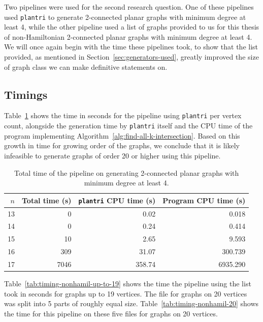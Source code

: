Two pipelines were used for the second research question. One of these pipelines used \texttt{plantri} to generate 2-connected planar graphs with minimum degree at least 4, while the other pipeline used a list of graphs provided to us for this thesis of non-Hamiltonian 2-connected planar graphs with minimum degree at least 4. We will once again begin with the time these pipelines took, to show that the list provided, as mentioned in Section~\ref{sec:generators-used}, greatly improved the size of graph class we can make definitive statements on.

\subsection{Timings}
\label{sec:2-timing}

Table~\ref{tab:timing-planar-m4} shows the time in seconds for the pipeline using \texttt{plantri} per vertex count, alongside the generation time by \texttt{plantri} itself and the CPU time of the program implementing Algorithm~\ref{alg:find-all-k-intersection}. Based on this growth in time for growing order of the graphs, we conclude that it is likely infeasible to generate graphs of order 20 or higher using this pipeline.

\begin{table}[ht]
\centering
\caption{Total time of the pipeline on generating 2-connected planar graphs with minimum degree at least 4.}
\label{tab:timing-planar-m4}
\begin{tabular}{rrrr}
\toprule
$n$ & Total time (s) & \texttt{plantri} CPU time (s) & Program CPU time (s) \\
\midrule
13 & 0 & 0.02 & 0.018 \\
14 & 0 & 0.24 & 0.414 \\
15 & 10 & 2.65 & 9.593 \\
16 & 309 & 31.07 & 300.739 \\
17 & 7046 & 358.74 & 6935.290 \\
\bottomrule
\end{tabular}
\end{table}

Table~\ref{tab:timing-nonhamil-up-to-19} shows the time the pipeline using the list took in seconds for graphs up to 19 vertices. The file for graphs on 20 vertices was split into 5 parts of roughly equal size. Table~\ref{tab:timing-nonhamil-20} shows the time for this pipeline on these five files for graphs on 20 vertices. 

